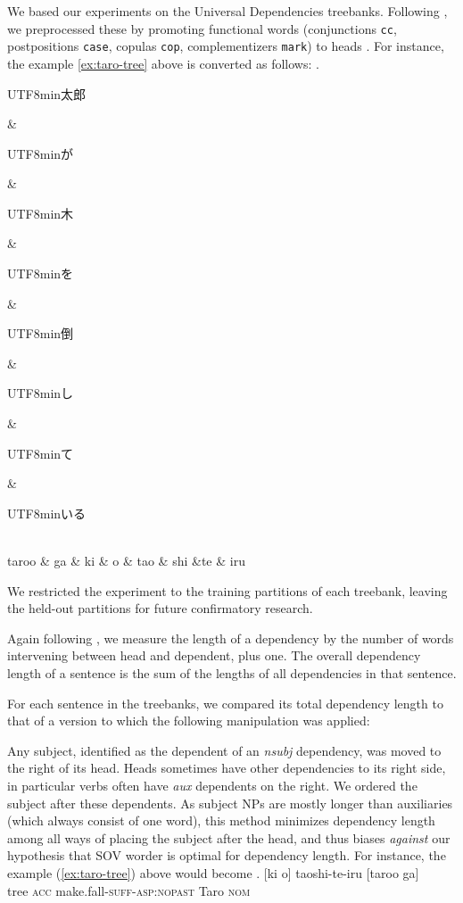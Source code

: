 \documentclass[11pt,a4paper]{article}
\newcommand{\japanese}[1]{\begin{CJK}{UTF8}{min}#1\end{CJK}}
\begin{document}
We based our experiments on the Universal Dependencies treebanks.
Following \cite{futrell2015largescale}, we preprocessed these by promoting functional words
(conjunctions \texttt{cc}, 
postpositions \texttt{case},
copulas \texttt{cop},
complementizers \texttt{mark}) to heads \citep{osborne2019status}.
For instance, the example \ref{ex:taro-tree} above is converted as follows:
\ex.
\begin{dependency}[theme = simple]
   \begin{deptext}[column sep=1em]
          \japanese{太郎} \& \japanese{が} \& \japanese{木} \& \japanese{を} \& \japanese{倒} \& \japanese{し} \& \japanese{て} \& \japanese{いる} \\
          taroo \& ga \& ki \& o \& tao \& shi \&te \& iru \\ 
   \end{deptext}
\end{dependency}


We restricted the experiment to the training partitions of each treebank, leaving the held-out partitions for future confirmatory research. 

Again following \cite{futrell2015largescale}, we measure the length of a dependency by the number of words intervening between head and dependent, plus one. 
The overall dependency length of a sentence is the sum of the lengths of all dependencies in that sentence.

For each sentence in the treebanks, we compared its total dependency length to that of a version to which the following manipulation was applied: %

Any subject, identified as the dependent of an \textit{nsubj} dependency, was moved to the right of its head.
Heads sometimes have other dependencies to its right side, in particular verbs often have \textit{aux} dependents on the right.
We ordered the subject after these dependents.
As subject NPs are mostly longer than auxiliaries (which always consist of one word), this method minimizes dependency length among all ways of placing the subject after the head, and thus biases \emph{against} our hypothesis that SOV worder is optimal for dependency length.
For instance, the example (\ref{ex:taro-tree}) above would become
\exg.  [ki o] taoshi-te-iru [taroo ga] \\
 tree \textsc{acc} make.fall-\textsc{suff}-\textsc{asp:nopast} Taro \textsc{nom}\\
\end{document}
